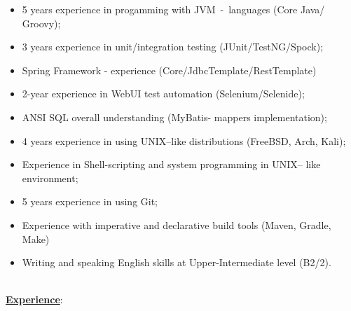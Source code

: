 \documentclass[hidelinks,12pt,a4paper,oneside]{article}
\newcommand*\tqs{\textquotesingle}
\begin{document}
{\normalsize
\begin{itemize}[noitemsep]
	\item 5 years experience in progamming with JVM\ -\ languages (Core \tqs Java\tqs /  \tqs Groovy\tqs);
	\item 3 years experience in unit/integration testing (\tqs JUnit\tqs/\tqs TestNG\tqs/\tqs Spock\tqs);
	\item Spring Framework - experience (Core/JdbcTemplate/RestTemplate)
	\item 2-year experience in WebUI test automation (\tqs Selenium\tqs/\tqs Selenide\tqs);
	\item ANSI SQL overall understanding (\tqs MyBatis\tqs - mappers implementation);
	\item 4 years experience in using \tqs UNIX\tqs --like distributions (\tqs FreeBSD\tqs, \tqs Arch\tqs, \tqs Kali\tqs);
	\item Experience in Shell-scripting and system programming in \tqs UNIX\tqs -- like environment;
	\item 5 years experience in using \tqs Git\tqs;
	\item Experience with imperative and declarative build tools (\tqs Maven\tqs, \tqs Gradle\tqs, \tqs Make\tqs)
	\item Writing and speaking English skills at Upper-Intermediate level (B2/2).
\end{itemize}}
\vspace{-15px}
\ \\
{\Large \underline{\textbf{Experience}}}:
\end{document}
